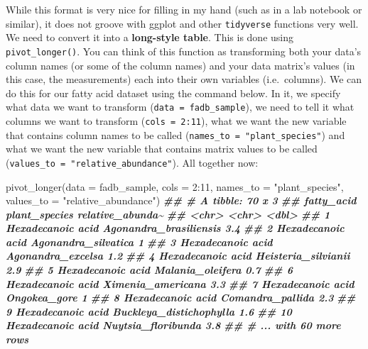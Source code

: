 \documentclass[
]{krantz}
\newenvironment{Shaded}{\begin{snugshade}}{\end{snugshade}}
\newcommand{\AttributeTok}[1]{\textcolor[rgb]{0.77,0.63,0.00}{#1}}
\newcommand{\DecValTok}[1]{\textcolor[rgb]{0.00,0.00,0.81}{#1}}
\newcommand{\DocumentationTok}[1]{\textcolor[rgb]{0.56,0.35,0.01}{\textbf{\textit{#1}}}}
\newcommand{\FunctionTok}[1]{\textcolor[rgb]{0.00,0.00,0.00}{#1}}
\newcommand{\NormalTok}[1]{#1}
\newcommand{\SpecialCharTok}[1]{\textcolor[rgb]{0.00,0.00,0.00}{#1}}
\newcommand{\StringTok}[1]{\textcolor[rgb]{0.31,0.60,0.02}{#1}}
\begin{document}
While this format is very nice for filling in my hand (such as in a lab notebook or similar), it does not groove with ggplot and other \texttt{tidyverse} functions very well. We need to convert it into a \textbf{long-style table}. This is done using \texttt{pivot\_longer()}. You can think of this function as transforming both your data's column names (or some of the column names) and your data matrix's values (in this case, the measurements) each into their own variables (i.e.~columns). We can do this for our fatty acid dataset using the command below. In it, we specify what data we want to transform (\texttt{data\ =\ fadb\_sample}), we need to tell it what columns we want to transform (\texttt{cols\ =\ 2:11}), what we want the new variable that contains column names to be called (\texttt{names\_to\ =\ "plant\_species"}) and what we want the new variable that contains matrix values to be called (\texttt{values\_to\ =\ "relative\_abundance"}). All together now:

\begin{Shaded}
\begin{Highlighting}[]
\FunctionTok{pivot\_longer}\NormalTok{(}\AttributeTok{data =}\NormalTok{ fadb\_sample, }\AttributeTok{cols =} \DecValTok{2}\SpecialCharTok{:}\DecValTok{11}\NormalTok{, }\AttributeTok{names\_to =} \StringTok{"plant\_species"}\NormalTok{, }\AttributeTok{values\_to =} \StringTok{"relative\_abundance"}\NormalTok{)}
\DocumentationTok{\#\# \# A tibble: 70 x 3}
\DocumentationTok{\#\#    fatty\_acid        plant\_species           relative\_abunda\textasciitilde{}}
\DocumentationTok{\#\#    \textless{}chr\textgreater{}             \textless{}chr\textgreater{}                              \textless{}dbl\textgreater{}}
\DocumentationTok{\#\#  1 Hexadecanoic acid Agonandra\_brasiliensis               3.4}
\DocumentationTok{\#\#  2 Hexadecanoic acid Agonandra\_silvatica                  1  }
\DocumentationTok{\#\#  3 Hexadecanoic acid Agonandra\_excelsa                    1.2}
\DocumentationTok{\#\#  4 Hexadecanoic acid Heisteria\_silvianii                  2.9}
\DocumentationTok{\#\#  5 Hexadecanoic acid Malania\_oleifera                     0.7}
\DocumentationTok{\#\#  6 Hexadecanoic acid Ximenia\_americana                    3.3}
\DocumentationTok{\#\#  7 Hexadecanoic acid Ongokea\_gore                         1  }
\DocumentationTok{\#\#  8 Hexadecanoic acid Comandra\_pallida                     2.3}
\DocumentationTok{\#\#  9 Hexadecanoic acid Buckleya\_distichophylla              1.6}
\DocumentationTok{\#\# 10 Hexadecanoic acid Nuytsia\_floribunda                   3.8}
\DocumentationTok{\#\# \# ... with 60 more rows}
\end{Highlighting}
\end{Shaded}
\end{document}
